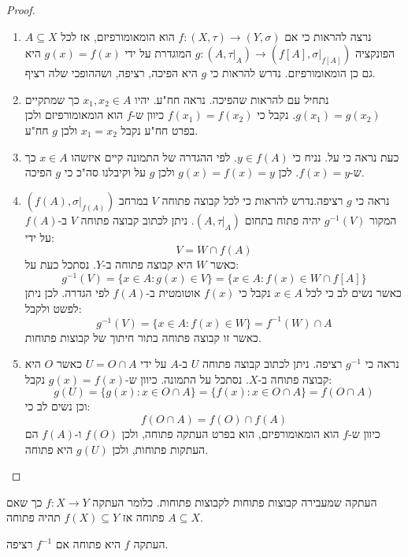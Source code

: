 \documentclass{tstextbook}
\begin{document}
\begin{proof}
  \begin{enumerate}
    \item נרצה להראות כי אם \(f:(X,\tau)\to(Y,\sigma)\) הוא הומאומורפיזם, אז לכל \(A\subseteq X\) הפונקציה \(g:(A,\tau|_{A})\to(f[A],\sigma|_{f[A]})\) המוגדרת על ידי \(g(x)=f(x)\) היא גם כן הומאומורפיזם. נדרש להראות כי \(g\) היא הפיכה, רציפה, ושההופכי שלה רציף. 


    \item נתחיל עם להראות שהפיכה. נראה חח"ע. יהיו \(x_{1},x_{2}\in A\) כך שמתקיים \(g(x_{1})=g(x_{2})\). נקבל כי \(f(x_{1})=f(x_{2})\) כיוון ש-\(f\) הוא הומאומורפיזם ולכן בפרט חח"ע נקבל \(x_{1}=x_{2}\) ולכן \(g\) חח"ע. 


    \item כעת נראה כי על. נניח כי \(y \in f(A)\). לפי ההגדרה של התמונה קיים איזשהו \(x \in A\) כך ש-\(f(x)=y\). לכן \(g(x)=f(x)=y\) ולכן \(g\) על וקיבלנו סה"כ כי \(g\) הפיכה. 


    \item נראה כי \(g\) רציפה.נדרש להראות כי לכל קבוצה פתוחה \(V\) במרחב \((f(A),\sigma|_{f(A)})\) המקור \(g^{-1}(V)\) יהיה פתוח בתחום \((A,\tau|_{A})\). ניתן לכתוב קבוצה פתוחה \(V\) ב-\(f(A)\) על ידי: 
$$V=W\cap f(A)$$
כאשר \(W\) היא קבוצה פתוחה ב-\(Y\).  נסתכל כעת על:
$$g^{-1}(V)=\{x\in A:g(x)\in V\}=\{x\in A:f(x)\in W\cap f[A]\}$$
כאשר נשים לב כי לכל \(x \in A\) נקבל כי \(f(x)\) אוטומטית ב-\(f(A)\) לפי הגדרה. לכן ניתן לפשט ולקבל:
$$g^{-1}(V)=\{x\in A:f(x)\in W\}=f^{-1}(W)\cap A$$
כאשר זו קבוצה פתוחה בתור חיתוך של קבוצות פתוחות.


    \item נראה כי \(g^{-1}\) רציפה. ניתן לכתוב קבוצה פתוחה \(U\) ב-\(A\) על ידי \(U=O\cap A\) כאשר \(O\) היא קבוצה פתוחה ב-\(X\). נסתכל על התמונה. כיוון ש-\(g(x)=f(x)\) נקבל: 
$$g(U)=\{g(x):x\in O\cap A\}=\{f(x):x\in O\cap A\}=f(O\cap A)$$
וכן נשים לב כי:
$$f(O\cap A)=f(O)\cap f(A)$$
כיוון ש-\(f\) הוא הומאומורפיזם, הוא בפרט העתקה פתוחה, ולכן \(f(O)\) ו-\(f(A)\) הם העתקות פתוחות, ולכן \(g(U)\) היא פתוחה.


  \end{enumerate}
\end{proof}
\begin{definition}
העתקה שמעבירה קבוצות פתוחות לקבוצות פתוחות. כלומר העתקה \(f:X\to Y\) כך שאם \(A\subseteq X\) פתוחה אז \(f(X)\subseteq Y\) תהיה פתוחה.

\end{definition}
\begin{proposition}
העתקה \(f\) היא פתוחה אם \(f^{-1}\) רציפה.

\end{proposition}
\end{document}

